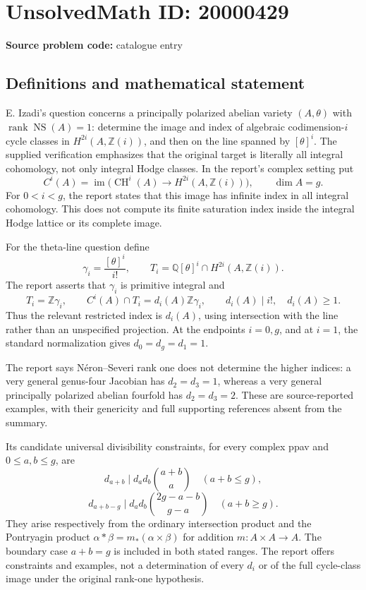 \documentclass[11pt]{article}
\newcommand{\Z}{\mathbb{Z}}
\newcommand{\Q}{\mathbb{Q}}
\begin{document}
\section*{UnsolvedMath ID: 20000429}
\textbf{Source problem code:} catalogue entry
\subsection{Definitions and mathematical statement}
E. Izadi's question concerns a principally polarized abelian variety \((A,\theta)\) with \(\operatorname{rank}\operatorname{NS}(A)=1\): determine the image and index of algebraic codimension-\(i\) cycle classes in \(H^{2i}(A,\Z(i))\), and then on the line spanned by \([\theta]^i\). The supplied verification emphasizes that the original target is literally all integral cohomology, not only integral Hodge classes. In the report's complex setting put
\[
C^i(A)=\operatorname{im}\bigl(\operatorname{CH}^i(A)\to H^{2i}(A,\Z(i))\bigr),\qquad \dim A=g.
\]
For \(0<i<g\), the report states that this image has infinite index in all integral cohomology. This does not compute its finite saturation index inside the integral Hodge lattice or its complete image.

For the theta-line question define
\[
\gamma_i=\frac{[\theta]^i}{i!},\qquad
T_i=\Q[\theta]^i\cap H^{2i}(A,\Z(i)).
\]
The report asserts that \(\gamma_i\) is primitive integral and
\[
T_i=\Z\gamma_i,\qquad C^i(A)\cap T_i=d_i(A)\Z\gamma_i,
\qquad d_i(A)\mid i!,\quad d_i(A)\geq1.
\]
Thus the relevant restricted index is \(d_i(A)\), using intersection with the line rather than an unspecified projection. At the endpoints \(i=0,g\), and at \(i=1\), the standard normalization gives \(d_0=d_g=d_1=1\).

The report says N\'eron--Severi rank one does not determine the higher indices: a very general genus-four Jacobian has \(d_2=d_3=1\), whereas a very general principally polarized abelian fourfold has \(d_2=d_3=2\). These are source-reported examples, with their genericity and full supporting references absent from the summary.

Its candidate universal divisibility constraints, for every complex ppav and \(0\leq a,b\leq g\), are
\[
d_{a+b}\mid d_a d_b\binom{a+b}{a}\quad(a+b\leq g),
\]
\[
d_{a+b-g}\mid d_a d_b\binom{2g-a-b}{g-a}\quad(a+b\geq g).
\]
They arise respectively from the ordinary intersection product and the Pontryagin product \(\alpha*\beta=m_*(\alpha\times\beta)\) for addition \(m:A\times A\to A\). The boundary case \(a+b=g\) is included in both stated ranges. The report offers constraints and examples, not a determination of every \(d_i\) or of the full cycle-class image under the original rank-one hypothesis.
\end{document}
